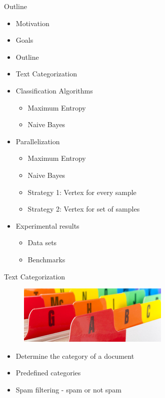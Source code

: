 \documentclass{beamer}
\begin{document}
\begin{frame}{Outline}

\begin{itemize}
 \item Motivation
 \item Goals
 \item Outline
 \item Text Categorization
 \item Classification Algorithms
	\begin{itemize}
	\item  Maximum Entropy
	\item  Naive Bayes
	\end{itemize}
 \item Parallelization
	\begin{itemize}
	\item  Maximum Entropy
	\item  Naive Bayes
	\item  Strategy 1: Vertex for every sample
	\item  Strategy 2: Vertex for set of samples
	\end{itemize}
 \item Experimental results
	\begin{itemize}
	\item Data sets
	\item Benchmarks
	\end{itemize}
\end{itemize}

\end{frame}


\begin{frame}{Text Categorization}

\begin{figure}[!htb]
  \centering
  \includegraphics[scale=0.6]{presentation/text_categorization.jpg}
\end{figure}

\begin{itemize}
 \item Determine the category of a document
 \item Predefined categories
 \item Spam filtering - spam or not spam
\end{itemize}

\end{frame}
\end{document}
